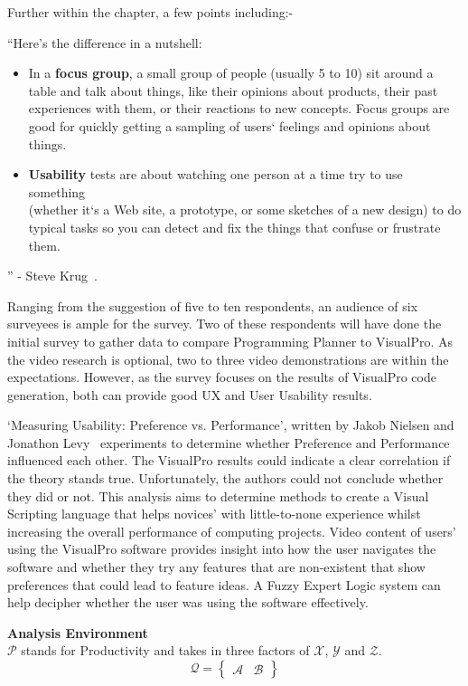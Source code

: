 \documentclass[12pt]{report} %
\begin{document}
	Further within the chapter, a few points including:-
	\begin{center}
		``Here's the difference in a nutshell:
		\begin{itemize}
			\item In a \textbf{focus group}, a small group of people (usually 5 to 10) sit around a table and talk about things, like their opinions about products, their past experiences with them, or their reactions to new concepts. Focus groups are good for quickly getting a sampling of users` feelings and opinions about things.
			\item \textbf{Usability} tests are about watching one person at a time try to use something\\(whether it`s a Web site, a prototype, or some sketches of a new design) to do typical tasks so you can detect and fix the things that confuse or frustrate them.
		\end{itemize}
		'' - Steve Krug~\cite{krug_steve_dont_2014}.
	\end{center}

	Ranging from the suggestion of five to ten respondents, an audience of six surveyees is ample for the survey. Two of these respondents will have done the initial survey to gather data to compare Programming Planner to VisualPro. As the video research is optional, two to three video demonstrations are within the expectations. However, as the survey focuses on the results of VisualPro code generation, both can provide good UX and User Usability results.

	`Measuring Usability: Preference vs. Performance', written by Jakob Nielsen and Jonathon Levy~\cite{nielsen_measuring_1994} experiments to determine whether Preference and Performance influenced each other. The VisualPro results could indicate a clear correlation if the theory stands true.
	Unfortunately, the authors could not conclude whether they did or not. This analysis aims to determine methods to create a Visual Scripting language that helps novices' with little-to-none experience whilst increasing the overall performance of computing projects. Video content of users' using the VisualPro software provides insight into how the user navigates the software and whether they try any features that are non-existent that show preferences that could lead to feature ideas. A Fuzzy Expert Logic system can help decipher whether the user was using the software effectively.

	\begin{center}
		\textbf{Analysis Environment}\\
		$\mathcal{P}$ stands for Productivity and takes in three factors of $\mathcal{X}$, $\mathcal{Y}$ and $\mathcal{Z}$.
		\[ \mathcal{Q} = \left\{
			\begin{array}{cc}
				\mathcal{A} & \mathcal{B}
			\end{array}\right\}
		\]
	\end{center}
\end{document}
